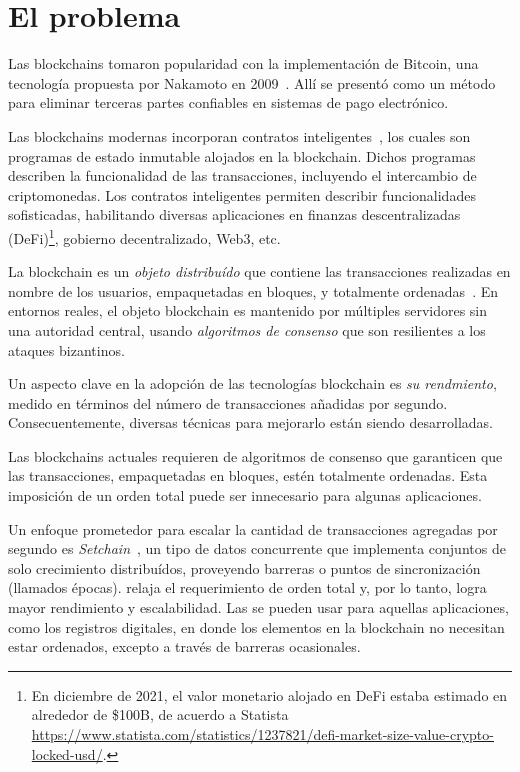 
\section{El problema}
Las blockchains tomaron
popularidad con la implementación de Bitcoin, una tecnología propuesta por Nakamoto en
2009~\cite{nakamoto06bitcoin}.
Allí se presentó como un método para eliminar terceras partes confiables en sistemas
de pago electrónico.
%

Las blockchains modernas incorporan contratos inteligentes~\cite{szabo96smart,ethereum},
los cuales son programas de estado inmutable alojados en la blockchain. Dichos
programas describen la funcionalidad de las transacciones, incluyendo el intercambio
de criptomonedas.
%
Los contratos inteligentes permiten describir funcionalidades sofisticadas, habilitando
diversas aplicaciones en finanzas descentralizadas (DeFi)\footnote{En diciembre de 2021,
el valor monetario alojado en DeFi estaba estimado en alrededor de \$100B, de acuerdo a Statista
\url{https://www.statista.com/statistics/1237821/defi-market-size-value-crypto-locked-usd/}.},
gobierno decentralizado, Web3, etc.
%

La blockchain es un \textit{objeto distribuído} que contiene las transacciones realizadas
en nombre de los usuarios, empaquetadas en bloques, y totalmente
ordenadas~\cite{anta2018formalizing,anta2021principles}.
%
En entornos reales, el objeto blockchain es mantenido por múltiples servidores
sin una autoridad central, usando \emph{algoritmos de consenso} que son resilientes a los
ataques bizantinos.
%

Un aspecto clave en la adopción de las tecnologías blockchain es \emph{su rendmiento}, medido
en términos del número de transacciones añadidas por segundo.
%
Consecuentemente, diversas técnicas para mejorarlo están siendo desarrolladas.
%

Las blockchains actuales requieren de algoritmos de consenso que garanticen que las
transacciones, empaquetadas en bloques, estén totalmente ordenadas.
%
Esta imposición de un orden total puede ser innecesario para algunas aplicaciones.

%
Un enfoque prometedor para escalar la cantidad de transacciones agregadas por segundo
es \textit{Setchain}~\cite{Capretto.2022.Setchain},
un tipo de datos concurrente que implementa conjuntos de solo crecimiento distribuídos,
proveyendo barreras o puntos de sincronización (llamados épocas).
%
\setchain relaja el requerimiento de orden total y, por lo tanto, logra mayor
rendimiento y escalabilidad.
%
Las \setchains se pueden usar para aquellas aplicaciones, como los registros digitales,
en donde los elementos en la blockchain no necesitan estar ordenados, excepto a través
de barreras ocasionales.

